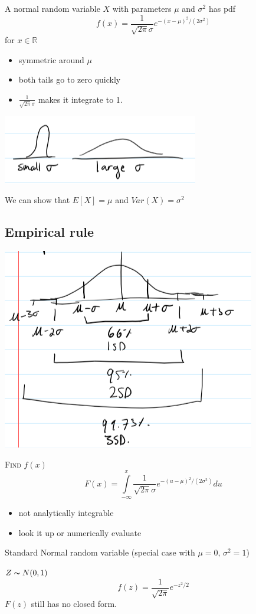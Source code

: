 \begin{defbox}
    A normal random variable $ X $ with parameters $ \mu $ and $ \sigma^2 $ has pdf
    \[ f(x)=\frac{1}{\sqrt{2\pi}\sigma}e^{-(x-\mu)^2/(2\sigma^2)}\]
    for $ x\in\mathbb{R} $
\end{defbox}
\begin{itemize}
    \item symmetric around $ \mu $
    \item both tails go to zero quickly
    \item $\frac{1}{\sqrt{2\pi}\sigma}$ makes it integrate to 1.
\end{itemize}

\begin{center}
    \includegraphics{sigma.png}
\end{center}
We can show that $ E[X]=\mu $ and $ Var(X)=\sigma^2 $

\subsection{Empirical rule}
\begin{center}
    \includegraphics{emp.png}
\end{center}

\textsc{Find $ f(x) $}
\[ F(x)=\int\limits_{-\infty}^{x} \frac{1}{\sqrt{2\pi}\sigma}e^{-(u-\mu)^2/(2\sigma^2)} d{u} \]
\begin{itemize}
    \item not analytically integrable
    \item look it up or numerically evaluate
\end{itemize}
Standard Normal random variable (special case with $ \mu=0,\,\sigma^2=1 $)

$ Z \thicksim N(0,1) $
\[ f(z)=\frac{1}{\sqrt{2\pi}}e^{-z^2/2} \]
$ F(z) $ still has no closed form.
